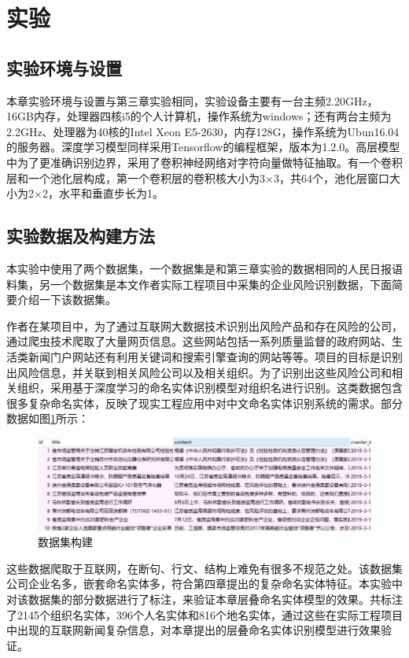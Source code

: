 \documentclass[winfonts,master,oneside,nobackinfo]{njuthesis}
\begin{document}
\section{实验}

\subsection{实验环境与设置}

本章实验环境与设置与第三章实验相同，实验设备主要有一台主频2.20GHz，16GB内存，处理器四核i5的个人计算机，操作系统为windows；还有两台主频为2.2GHz、处理器为40核的Intel Xeon E5-2630，内存128G，操作系统为Ubun16.04的服务器。深度学习模型同样采用Tensorflow的编程框架，版本为1.2.0。高层模型中为了更准确识别边界，采用了卷积神经网络对字符向量做特征抽取。有一个卷积层和一个池化层构成，第一个卷积层的卷积核大小为3×3，共64个，池化层窗口大小为2×2，水平和垂直步长为1。

\subsection{实验数据及构建方法}

本实验中使用了两个数据集，一个数据集是和第三章实验的数据相同的人民日报语料集，另一个数据集是本文作者实际工程项目中采集的企业风险识别数据，下面简要介绍一下该数据集。

作者在某项目中，为了通过互联网大数据技术识别出风险产品和存在风险的公司，通过爬虫技术爬取了大量网页信息。这些网站包括一系列质量监督的政府网站、生活类新闻门户网站还有利用关键词和搜索引擎查询的网站等等。项目的目标是识别出风险信息，并关联到相关风险公司以及相关组织。为了识别出这些风险公司和相关组织，采用基于深度学习的命名实体识别模型对组织名进行识别。这类数据包含很多复杂命名实体，反映了现实工程应用中对中文命名实体识别系统的需求。部分数据如图\ref{train-data}所示：

\begin{figure}[h]
\centering
\includegraphics[width=1\textwidth]{./figure/数据集.jpg}
\caption{数据集构建}
\label{train-data}
\end{figure}
这些数据爬取于互联网，在断句、行文、结构上难免有很多不规范之处。该数据集公司企业名多，嵌套命名实体多，符合第四章提出的复杂命名实体特征。本实验中对该数据集的部分数据进行了标注，来验证本章层叠命名实体模型的效果。共标注了2145个组织名实体，396个人名实体和816个地名实体，通过这些在实际工程项目中出现的互联网新闻复杂信息，对本章提出的层叠命名实体识别模型进行效果验证。
\end{document}
